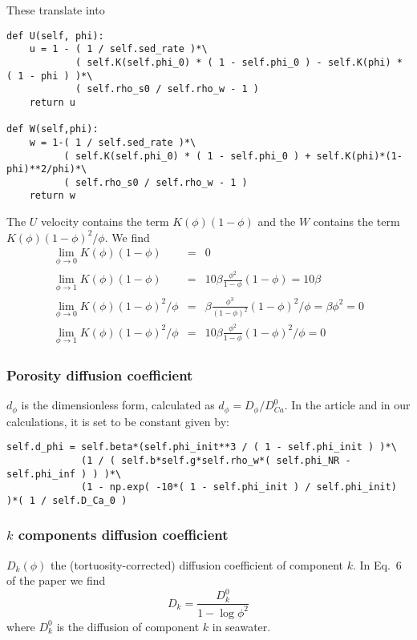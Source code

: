 \documentclass[a4paper]{article}
\newcommand{\nn}{\nonumber}
\begin{document}
These translate into
\begin{lstlisting}
def U(self, phi):
    u = 1 - ( 1 / self.sed_rate )*\
            ( self.K(self.phi_0) * ( 1 - self.phi_0 ) - self.K(phi) * ( 1 - phi ) )*\
            ( self.rho_s0 / self.rho_w - 1 )
    return u

def W(self,phi):
    w = 1-( 1 / self.sed_rate )*\
          ( self.K(self.phi_0) * ( 1 - self.phi_0 ) + self.K(phi)*(1-phi)**2/phi)*\
          ( self.rho_s0 / self.rho_w - 1 )
    return w
\end{lstlisting}

The $U$ velocity contains the term $K(\phi)(1-\phi)$
and the $W$ contains the term $K(\phi)(1-\phi)^2/\phi$.
We find
\begin{eqnarray}
\lim_{\phi\rightarrow 0} K(\phi)(1-\phi) &=& 0 \nn\\
\lim_{\phi\rightarrow 1} K(\phi)(1-\phi) &=& 10 \beta \frac{\phi^2}{1-\phi}(1-\phi) = 10 \beta\nn\\
\lim_{\phi\rightarrow 0} K(\phi)(1-\phi)^2/\phi 
&=& \beta  \frac{\phi^3}{(1-\phi)^2} (1-\phi)^2/\phi = \beta \phi^2 = 0 \nn\\
\lim_{\phi\rightarrow 1} K(\phi)(1-\phi)^2/\phi &=& 10 \beta \frac{\phi^2}{1-\phi} (1-\phi)^2/\phi = 0 \nn
\end{eqnarray}

\subsubsection*{Porosity diffusion coefficient}

$d_\phi$ is the dimensionless form, calculated as $d_\phi=D_\phi/D^0_{Ca}$.
In the article and in our calculations, it is set to be constant given by:

\begin{lstlisting}
self.d_phi = self.beta*(self.phi_init**3 / ( 1 - self.phi_init ) )*\ 
             (1 / ( self.b*self.g*self.rho_w*( self.phi_NR - self.phi_inf ) ) )*\ 
             (1 - np.exp( -10*( 1 - self.phi_init ) / self.phi_init) )*( 1 / self.D_Ca_0 )
\end{lstlisting}

\subsubsection*{$k$ components diffusion coefficient}

$D_k(\phi)$ the (tortuosity-corrected) diffusion
coefficient of component $k$.
In Eq.~6 of the paper we find 
\[
D_k = \frac{D_k^0}{1- \log \phi^2}
\]
where $D_k^0$ is the diffusion of component $k$ in seawater.
\end{document}
